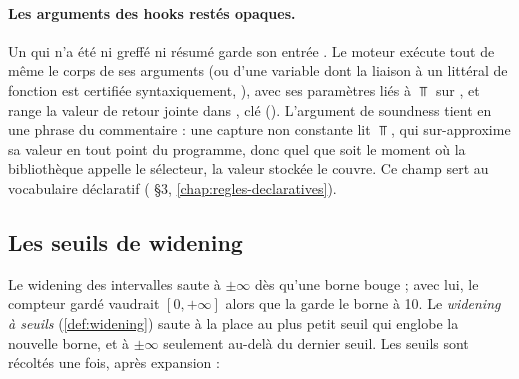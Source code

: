 \paragraph{Les arguments des hooks restés opaques.} Un 
qui n'a été ni greffé ni résumé garde son entrée . Le moteur
exécute tout de même le corps de ses arguments  (ou d'une variable
dont la liaison à un littéral de fonction est certifiée syntaxiquement,
), avec ses paramètres liés à $\Top$ sur
, et range la valeur de retour jointe dans
, clé 
(). L'argument de soundness tient en
une phrase du commentaire : une capture non constante lit $\Top$, qui
sur-approxime sa valeur en tout point du programme, donc quel que soit le
moment où la bibliothèque appelle le sélecteur, la valeur stockée le couvre.
Ce champ sert au vocabulaire déclaratif ( §3, \cref{chap:regles-declaratives}).

\subsection{Les seuils de widening}
\label{sec:point-fixe-composant-seuils}

Le widening des intervalles saute à $\pm\infty$ dès qu'une borne bouge ; avec
lui, le compteur gardé  vaudrait
$[0, +\infty]$ alors que la garde le borne à 10. Le \emph{widening à seuils}
(\cref{def:widening}) saute à la place au plus petit seuil qui englobe la
nouvelle borne, et à $\pm\infty$ seulement au-delà du dernier seuil. Les
seuils sont récoltés une fois, après expansion :


